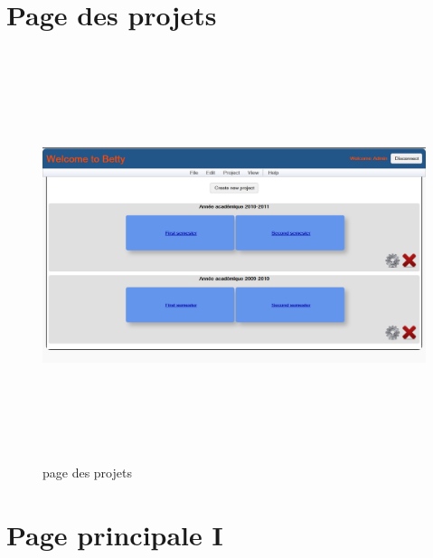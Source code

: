 \section{Page des projets}
\label{annexe/espace_nom}

\begin{figure}[!h]
	\begin{center}
		\includegraphics[width=19cm,height=12cm,angle=90]{ProjectPage.png}
		\caption{page des projets}
	\end{center}
\end{figure}\newpage

\newpage

\section{Page principale I}
\label{annexe/espace_nom}

